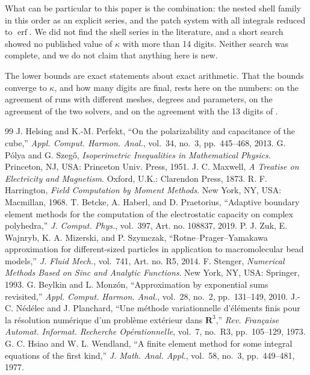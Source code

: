 \documentclass[journal]{IEEEtran}
\newcommand{\erf}{\operatorname{erf}}
\begin{document}
What can be particular to this paper is the combination: the nested shell family in this order as an explicit series, and the patch system with all integrals reduced to $\erf$. We did not find the shell series in the literature, and a short search showed no published value of $\kappa$ with more than 14 digits. Neither search was complete, and we do not claim that anything here is new.

The lower bounds are exact statements about exact arithmetic. That the bounds converge to $\kappa$, and how many digits are final, rests here on the numbers: on the agreement of runs with different meshes, degrees and parameters, on the agreement of the two solvers, and on the agreement with the 13 digits of \cite{helsing}.

\begin{thebibliography}{99}
 J. Helsing and K.-M. Perfekt, ``On the polarizability and capacitance of the cube,'' \emph{Appl. Comput. Harmon. Anal.}, vol.~34, no.~3, pp.~445--468, 2013.
 G. P\'olya and G. Szeg\H{o}, \emph{Isoperimetric Inequalities in Mathematical Physics}. Princeton, NJ, USA: Princeton Univ. Press, 1951.
 J. C. Maxwell, \emph{A Treatise on Electricity and Magnetism}. Oxford, U.K.: Clarendon Press, 1873.
 R. F. Harrington, \emph{Field Computation by Moment Methods}. New York, NY, USA: Macmillan, 1968.
 T. Betcke, A. Haberl, and D. Praetorius, ``Adaptive boundary element methods for the computation of the electrostatic capacity on complex polyhedra,'' \emph{J. Comput. Phys.}, vol.~397, Art. no. 108837, 2019.
 P. J. Zuk, E. Wajnryb, K. A. Mizerski, and P. Szymczak, ``Rotne--Prager--Yamakawa approximation for different-sized particles in application to macromolecular bead models,'' \emph{J. Fluid Mech.}, vol.~741, Art. no. R5, 2014.
 F. Stenger, \emph{Numerical Methods Based on Sinc and Analytic Functions}. New York, NY, USA: Springer, 1993.
 G. Beylkin and L. Monz\'on, ``Approximation by exponential sums revisited,'' \emph{Appl. Comput. Harmon. Anal.}, vol.~28, no.~2, pp.~131--149, 2010.
 J.-C. N\'ed\'elec and J. Planchard, ``Une m\'ethode variationnelle d'\'el\'ements finis pour la r\'esolution num\'erique d'un probl\`eme ext\'erieur dans $\mathbf{R}^3$,'' \emph{Rev. Fran\c{c}aise Automat. Informat. Recherche Op\'erationnelle}, vol.~7, no.~R3, pp.~105--129, 1973.
 G. C. Hsiao and W. L. Wendland, ``A finite element method for some integral equations of the first kind,'' \emph{J. Math. Anal. Appl.}, vol.~58, no.~3, pp.~449--481, 1977.

\end{thebibliography}
\end{document}
